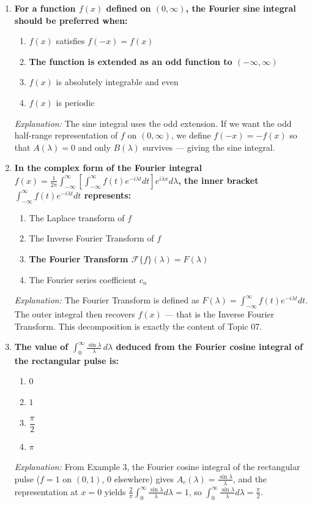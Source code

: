 \documentclass[12pt,a4paper]{article}
\begin{document}
\begin{enumerate}[label=\textbf{MCQ \arabic*.}]
\item \textbf{For a function $f(x)$ defined on $(0,\infty)$, the Fourier sine integral should be preferred when:}
\begin{enumerate}[label=(\alph*)]
  \item $f(x)$ satisfies $f(-x)=f(x)$
  \item \textbf{The function is extended as an odd function to $(-\infty,\infty)$}
  \item $f(x)$ is absolutely integrable and even
  \item $f(x)$ is periodic
\end{enumerate}
\textit{Explanation:} The sine integral uses the odd extension. If we want the odd half-range representation of $f$ on $(0,\infty)$, we define $f(-x)=-f(x)$ so that $A(\lambda)=0$ and only $B(\lambda)$ survives --- giving the sine integral.

\item \textbf{In the complex form of the Fourier integral
$f(x)=\frac{1}{2\pi}\int_{-\infty}^\infty\left[\int_{-\infty}^\infty f(t)e^{-i\lambda t}dt\right]e^{i\lambda x}d\lambda$,
the inner bracket $\int_{-\infty}^\infty f(t)e^{-i\lambda t}dt$ represents:}
\begin{enumerate}[label=(\alph*)]
  \item The Laplace transform of $f$
  \item The Inverse Fourier Transform of $f$
  \item \textbf{The Fourier Transform $\mathcal{F}\{f\}(\lambda)=F(\lambda)$}
  \item The Fourier series coefficient $c_n$
\end{enumerate}
\textit{Explanation:} The Fourier Transform is defined as $F(\lambda)=\int_{-\infty}^\infty f(t)e^{-i\lambda t}dt$. The outer integral then recovers $f(x)$ --- that is the Inverse Fourier Transform. This decomposition is exactly the content of Topic 07.

\item \textbf{The value of $\displaystyle\int_0^\infty\frac{\sin\lambda}{\lambda}\,d\lambda$ deduced from the Fourier cosine integral of the rectangular pulse is:}
\begin{enumerate}[label=(\alph*)]
  \item $0$
  \item $1$
  \item \textbf{$\dfrac{\pi}{2}$}
  \item $\pi$
\end{enumerate}
\textit{Explanation:} From Example 3, the Fourier cosine integral of the rectangular pulse ($f=1$ on $(0,1)$, $0$ elsewhere) gives $A_c(\lambda)=\frac{\sin\lambda}{\lambda}$, and the representation at $x=0$ yields $\frac{2}{\pi}\int_0^\infty\frac{\sin\lambda}{\lambda}d\lambda=1$, so $\int_0^\infty\frac{\sin\lambda}{\lambda}d\lambda=\frac{\pi}{2}$.

\end{enumerate}
\end{document}

